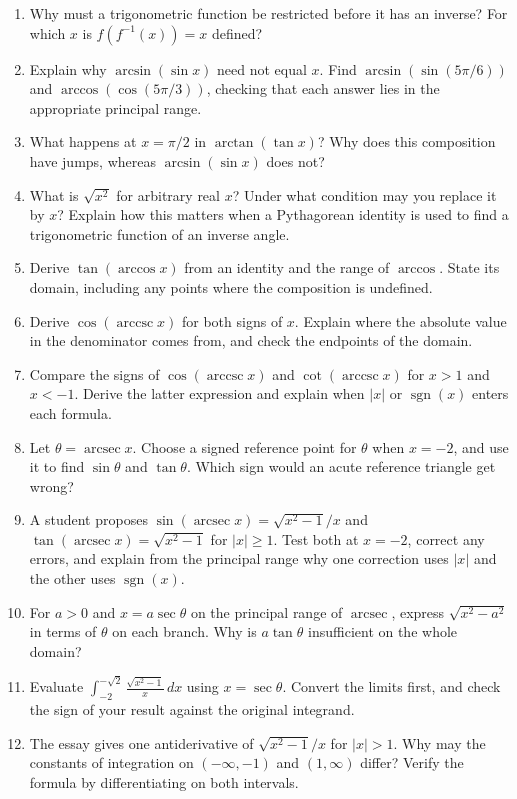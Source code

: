 \documentclass{essay}
\DeclareMathOperator{\arcsec}{arcsec}
\DeclareMathOperator{\arccsc}{arccsc}
\DeclareMathOperator{\sgn}{sgn}
\begin{document}
\begin{enumerate}
  \item Why must a trigonometric function be restricted before it has an
        inverse? For which $x$ is $f(f^{-1}(x))=x$ defined?
  \item Explain why $\arcsin(\sin x)$ need not equal $x$. Find
        $\arcsin(\sin(5\pi/6))$ and $\arccos(\cos(5\pi/3))$, checking
        that each answer lies in the appropriate principal range.
  \item What happens at $x=\pi/2$ in $\arctan(\tan x)$? Why does this
        composition have jumps, whereas $\arcsin(\sin x)$ does not?
  \item What is $\sqrt{x^2}$ for arbitrary real $x$? Under what
        condition may you replace it by $x$? Explain how this matters
        when a Pythagorean identity is used to find a trigonometric
        function of an inverse angle.
  \item Derive $\tan(\arccos x)$ from an identity and the range of
        $\arccos$. State its domain, including any points where the
        composition is undefined.
  \item Derive $\cos(\arccsc x)$ for both signs of $x$. Explain where
        the absolute value in the denominator comes from, and check
        the endpoints of the domain.
  \item Compare the signs of $\cos(\arccsc x)$ and
        $\cot(\arccsc x)$ for $x>1$ and $x<-1$. Derive the latter
        expression and explain when $|x|$ or $\sgn(x)$ enters each
        formula.
  \item Let $\theta=\arcsec x$. Choose a signed reference point for
        $\theta$ when $x=-2$, and use it to find $\sin\theta$ and
        $\tan\theta$. Which sign would an acute reference triangle get
        wrong?
  \item A student proposes
        $\sin(\arcsec x)=\sqrt{x^2-1}/x$ and
        $\tan(\arcsec x)=\sqrt{x^2-1}$ for $|x|\ge1$. Test both at
        $x=-2$, correct any errors, and explain from the principal
        range why one correction uses $|x|$ and the other uses
        $\sgn(x)$.
  \item For $a>0$ and $x=a\sec\theta$ on the principal range of
        $\arcsec$, express $\sqrt{x^2-a^2}$ in terms of $\theta$ on
        each branch. Why is $a\tan\theta$ insufficient on the whole
        domain?
  \item Evaluate $\displaystyle\int_{-2}^{-\sqrt{2}}
        \frac{\sqrt{x^2-1}}{x}\,dx$ using $x=\sec\theta$. Convert the
        limits first, and check the sign of your result against the
        original integrand.
  \item The essay gives one antiderivative of
        $\sqrt{x^2-1}/x$ for $|x|>1$. Why may the constants of
        integration on $(-\infty,-1)$ and $(1,\infty)$ differ? Verify
        the formula by differentiating on both intervals.
\end{enumerate}
\end{document}
